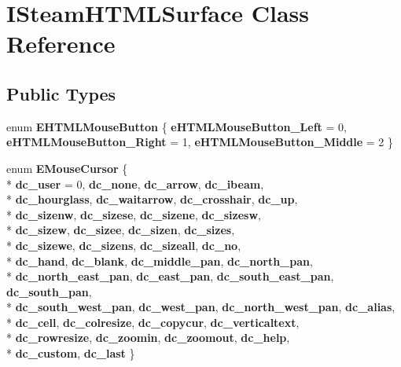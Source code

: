 \hypertarget{classISteamHTMLSurface}{}\section{I\+Steam\+H\+T\+M\+L\+Surface Class Reference}
\label{classISteamHTMLSurface}
\subsection*{Public Types}
\begin{DoxyCompactItemize}
\item 
\hypertarget{classISteamHTMLSurface_a116b20c2ab69e90338abc523de0a09fd}{}enum {\bfseries E\+H\+T\+M\+L\+Mouse\+Button} \{ {\bfseries e\+H\+T\+M\+L\+Mouse\+Button\+\_\+\+Left} = 0, 
{\bfseries e\+H\+T\+M\+L\+Mouse\+Button\+\_\+\+Right} = 1, 
{\bfseries e\+H\+T\+M\+L\+Mouse\+Button\+\_\+\+Middle} = 2
 \}\label{classISteamHTMLSurface_a116b20c2ab69e90338abc523de0a09fd}

\item 
\hypertarget{classISteamHTMLSurface_a4a9ceb3013cded62abe82b1b89749db6}{}enum {\bfseries E\+Mouse\+Cursor} \{ \\*
{\bfseries dc\+\_\+user} = 0, 
{\bfseries dc\+\_\+none}, 
{\bfseries dc\+\_\+arrow}, 
{\bfseries dc\+\_\+ibeam}, 
\\*
{\bfseries dc\+\_\+hourglass}, 
{\bfseries dc\+\_\+waitarrow}, 
{\bfseries dc\+\_\+crosshair}, 
{\bfseries dc\+\_\+up}, 
\\*
{\bfseries dc\+\_\+sizenw}, 
{\bfseries dc\+\_\+sizese}, 
{\bfseries dc\+\_\+sizene}, 
{\bfseries dc\+\_\+sizesw}, 
\\*
{\bfseries dc\+\_\+sizew}, 
{\bfseries dc\+\_\+sizee}, 
{\bfseries dc\+\_\+sizen}, 
{\bfseries dc\+\_\+sizes}, 
\\*
{\bfseries dc\+\_\+sizewe}, 
{\bfseries dc\+\_\+sizens}, 
{\bfseries dc\+\_\+sizeall}, 
{\bfseries dc\+\_\+no}, 
\\*
{\bfseries dc\+\_\+hand}, 
{\bfseries dc\+\_\+blank}, 
{\bfseries dc\+\_\+middle\+\_\+pan}, 
{\bfseries dc\+\_\+north\+\_\+pan}, 
\\*
{\bfseries dc\+\_\+north\+\_\+east\+\_\+pan}, 
{\bfseries dc\+\_\+east\+\_\+pan}, 
{\bfseries dc\+\_\+south\+\_\+east\+\_\+pan}, 
{\bfseries dc\+\_\+south\+\_\+pan}, 
\\*
{\bfseries dc\+\_\+south\+\_\+west\+\_\+pan}, 
{\bfseries dc\+\_\+west\+\_\+pan}, 
{\bfseries dc\+\_\+north\+\_\+west\+\_\+pan}, 
{\bfseries dc\+\_\+alias}, 
\\*
{\bfseries dc\+\_\+cell}, 
{\bfseries dc\+\_\+colresize}, 
{\bfseries dc\+\_\+copycur}, 
{\bfseries dc\+\_\+verticaltext}, 
\\*
{\bfseries dc\+\_\+rowresize}, 
{\bfseries dc\+\_\+zoomin}, 
{\bfseries dc\+\_\+zoomout}, 
{\bfseries dc\+\_\+help}, 
\\*
{\bfseries dc\+\_\+custom}, 
{\bfseries dc\+\_\+last}
 \}\label{classISteamHTMLSurface_a4a9ceb3013cded62abe82b1b89749db6}


\end{DoxyCompactItemize}
